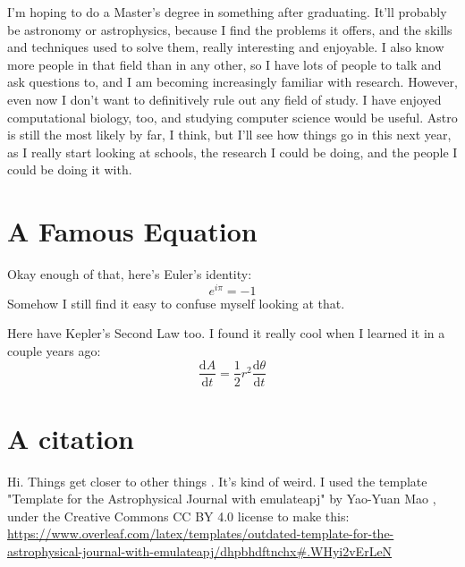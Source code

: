 \documentclass[iop,apj,tighten]{emulateapj}
\begin{document}
I'm hoping to do a Master's degree in something after graduating. It'll probably be astronomy or astrophysics, because I find the problems it offers, and the skills and techniques used to solve them, really interesting and enjoyable. I also know more people in that field than in any other, so I have lots of people to talk and ask questions to, and I am becoming increasingly familiar with research. However, even now I don't want to definitively rule out any field of study. I have enjoyed computational biology, too, and studying computer science would be useful. Astro is still the most likely by far, I think, but I'll see how things go in this next year, as I really start looking at schools, the research I could be doing, and the people I could be doing it with.

\section{A Famous Equation}
Okay enough of that, here's Euler's identity:
\begin{equation}
e^{i\pi}=-1
\end{equation}
Somehow I still find it easy to confuse myself looking at that.

Here have Kepler's Second Law too. I found it really cool when I learned it in a couple years ago:
\begin{equation}
\frac{\text{d}A}{\text{d}t}=\frac{1}{2}r^2\frac{\text{d}\theta}{\text{d}t}
\end{equation}

\section{A citation}
Hi. Things get closer to other things \citep{newton1833philosophiae}. It's kind of weird. I used the template "Template for the Astrophysical Journal with emulateapj" by Yao-Yuan Mao \citep{website:template}, under the Creative Commons CC BY 4.0 license to make this: \url{https://www.overleaf.com/latex/templates/outdated-template-for-the-astrophysical-journal-with-emulateapj/dhpbhdftnchx#.WHyi2vErLeN}



\end{document}

